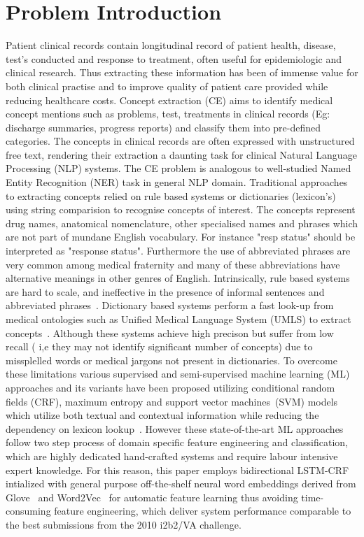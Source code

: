 \section{Problem Introduction}
\label{sec:conceptExtraction}
Patient clinical records contain  longitudinal record of patient health, disease, test's conducted  and response to treatment, often useful for epidemiologic and clinical research. Thus extracting these information  has been of immense value for both clinical practise and to improve  quality of patient care provided  while reducing healthcare costs. Concept extraction (CE) aims to identify medical concept mentions such as problems, test, treatments in  clinical  records (Eg: discharge summaries, progress reports) and classify them into pre-defined categories. The concepts in  clinical records are often expressed with unstructured free text, rendering their extraction a daunting task for  clinical Natural Language Processing (NLP) systems. The CE  problem is analogous to well-studied Named Entity Recognition (NER) task in general NLP domain. Traditional approaches to extracting concepts relied on  rule based systems or dictionaries (lexicon's) using string comparision to recognise concepts of interest. The concepts  represent drug names, anatomical nomenclature, other specialised names and phrases which are not part of mundane English vocabulary. For instance "resp status" should be interpreted as "response status". Furthermore the use of abbreviated phrases are very common among medical fraternity and many of these abbreviations have alternative meanings in other genres of English. Intrinsically, rule based systems are hard to scale, and ineffective in the presence of informal sentences and abbreviated phrases~\cite{liu2015drug}. Dictionary based systems perform a  fast look-up  from medical ontologies such as Unified Medical Language System (UMLS)  to extract concepts~\cite{kipper2008system}. Although these systems achieve high precison but suffer from low recall ( i,e they may not identify significant number of concepts) due to missplelled words or medical jargons not present in dictionaries. To overcome these limitations various supervised and semi-supervised machine learning (ML) approaches and its variants  have been proposed utilizing conditional random fields (CRF), maximum entropy and support vector machines~(SVM) models which utilize both textual and contextual information while reducing the dependency on lexicon lookup~\cite{lafferty2001conditional,berger1996maximum,joachims1998text}. However these state-of-the-art ML approaches follow two step process of domain specific feature engineering and classification, which are highly dedicated hand-crafted systems and require labour intensive expert knowledge. For this reason, this paper employs bidirectional LSTM-CRF intialized with  general purpose off-the-shelf neural word embeddings derived from Glove~\cite{Pennington:14} and Word2Vec~\cite{Mikolov:13}  for automatic feature learning thus avoiding time-consuming feature engineering,  which deliver system performance comparable to the best submissions from the 2010 i2b2/VA challenge.
